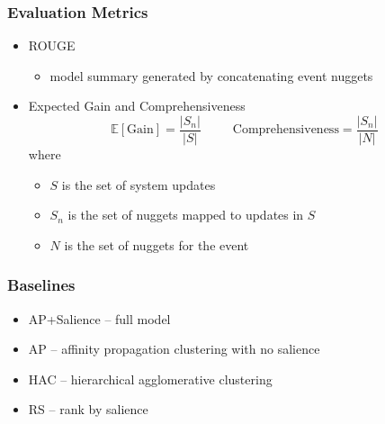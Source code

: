 \documentclass{beamer}
\begin{document}
\begin{frame}
    \frametitle{Evaluation Metrics}
    \begin{itemize}
        \pause
        \item ROUGE 
        \pause
        \begin{itemize}
            \item model summary generated by concatenating event nuggets
        \end{itemize}
        \pause
    \item Expected Gain and Comprehensiveness
        $$\mathbb{E}[\mathrm{Gain}] = \frac{|S_n|}{|S|}\;\;\;\;\;\;\;\;\;
            \textrm{Comprehensiveness} = \frac{|S_n|}{|N|}$$
            where \begin{itemize}
                    \pause
            \item[] $S$ is the set of system updates
                    \pause
                \item[] $S_n$ is the set of nuggets mapped to updates in $S$
                    \pause
                \item[] $N$ is the set of nuggets for the event
            \end{itemize}
    \end{itemize}
\end{frame}

\begin{frame}
    \frametitle{Baselines}
    \begin{itemize}
    \item AP+Salience -- full model
    \item AP -- affinity propagation clustering with no salience
    \item HAC -- hierarchical agglomerative clustering
    \item RS -- rank by salience
    \end{itemize}
\end{frame}
\end{document}
